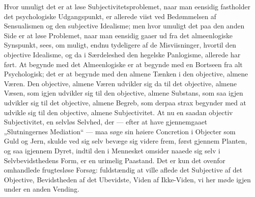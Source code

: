\documentclass[11pt]{book}
\begin{document}
Hvor umuligt det er at løse Subjectivitetsproblemet, naar man eensidig
fastholder det psychologiske Udgangspunkt, er allerede viist ved
Bedømmelsen af Sensualismen og den subjective Idealisme; men hvor
umuligt det paa den anden Side er at løse Problemet, naar man eensidig
gaaer ud fra det almeenlogiske Synspunkt, sees, om muligt, endnu
tydeligere af de Misviisninger, hvortil den objective Idealisme, og da
i Særdeleshed den hegelske Panlogisme, allerede har ført. At begynde
med det Almeenlogiske er at begynde med en Bortseen fra alt
Psychologisk; det er at begynde med den almene Tænken i den objective,
almene Væren. Den objective, almene Væren udvikler sig da til det
objective, almene Væsen, som igjen udvikler sig til den objective,
almene Substans, som saa igjen udvikler sig til det objective, almene
Begreb, som derpaa strax begynder med at udvikle sig til den
objective, almene Subjectivitet. At nu en saadan objectiv
Subjectivitet, en selvløs Selvhed, der --- efter at have gjennemgaaet
„Slutningernes Mediation“ --- maa søge sin høiere Concretion i
Objecter som Guld og Jern, skulde ved sig selv bevæge sig videre frem,
først gjennem Planten, og saa igjennem Dyret, indtil den i Mennesket
omsider naaede sig selv i Selvbevidsthedens Form, er en urimelig
Paastand. Det er kun det ovenfor omhandlede frugtesløse Forsøg:
fuldstændig at ville aflede det Subjective af det Objective,
Bevidstheden af det Ubevidste, Viden af Ikke-Viden, vi her møde igjen
under en anden Vending.
\end{document}
